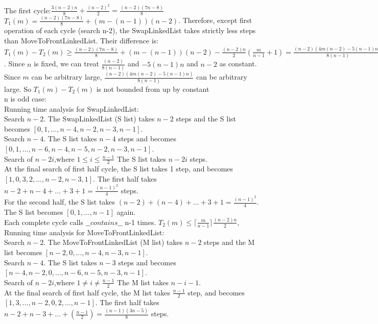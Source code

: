 \documentclass[fontsize=11pt]{article}
\begin{document}
\begin{enumerate}
\\The first cycle:$\frac{3(n-2)n}{8}+\frac{(n-2)^2}{2}=\frac{(n-2)(7n-8)}{8}$
\\$T_1(m)= \frac{(n-2)(7n-8)}{8}+(m-(n-1))(n-2)$.
Therefore, except first operation of each cycle (search n-2), the SwapLinkedList takes strictly less steps than MoveToFrontLinkedList. Their difference is:
\\$T_1(m)-T_2(m)\geq \frac{(n-2)(7n-8)}{8}+(m-(n-1))(n-2)-\frac{(n-2)n}{2}(\frac{m}{n-1}+1)=
\frac{(n-2)(4m(n-2)-5(n-1)n)}{8(n-1)}$. Since $n$ is fixed, we can treat $\frac{(n-2)}{8(n-1)}$ and $-5(n-1)n$ and $n-2$ as constant. Since $m$ can be arbitrary large, $\frac{(n-2)(4m(n-2)-5(n-1)n)}{8(n-1)}$ can be arbitrary large. So $T_1(m)-T_2(m)$ is not bounded from up by constant
\\n is odd case:
\\Running time analysis for SwapLinkedList:
\\Search $n-2$. The SwapLinkedList (S list) takes $n-2$ steps and the S list becomes $[0,1,...,n-4,n-2,n-3,n-1]$.
\\Search $n-4$. The S list takes $n-4$ steps and becomes $[0,1,...,n-6,n-4,n-5,n-2,n-3,n-1]$.
\\Search of $n-2i$,where $1\leq i \leq \frac{n-1}{2}$ The S list takes $n-2i$ steps.
\\At the final search of first half cycle, the S list takes 1 step, and becomes $[1,0,3,2,...,n-2,n-3,1]$. The first half takes $n-2+n-4+...+3+1=\frac{(n-1)^2}{4}$ steps.
\\For the second half, the S list takes $(n-2)+(n-4)+...+3+1=\frac{(n-1)^2}{4}$. The S list becomes $[0,1,...,n-1]$ again.
\\ Each complete cycle calls $\_\_contains\_\_$ n-1 times. $T_2(m)\leq \lceil\frac{m}{n-1}\rceil\frac{(n-2)n}{2}$,
\\Running time analysis for MoveToFrontLinkedList:
\\Search $n-2$. The MoveToFrontLinkedList (M list) takes $n-2$ steps and the M list becomes $[n-2,0,...,n-4,n-3,n-1]$.
\\Search $n-4$. The S list takes $n-3$ steps and becomes $[n-4, n-2,0,...,n-6, n-5,n-3,n-1]$.
\\Search of $n-2i$,where $1\neq i \neq \frac{n-1}{2}$ The M list takes $n-i-1$.
\\At the final search of first half cycle, the M list takes $\frac{n-1}{2}$ step, and becomes $[1,3,...,n-2,0,2,...,n-1]$. The first half takes $n-2+n-3+...+(\frac{n-1}{2})=\frac{(n-1)(3n-5)}{8}$ steps.

\end{enumerate}
\end{document}
